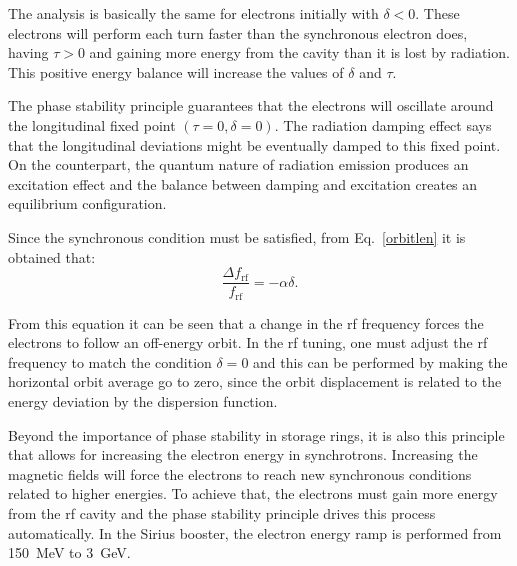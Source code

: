 The analysis is basically the same for electrons initially with $\delta < 0$. These electrons will perform each turn faster than the synchronous electron does, having $\tau > 0$ and gaining more energy from the cavity than it is lost by radiation. This positive energy balance will increase the values of $\delta$ and $\tau$.

The phase stability principle guarantees that the electrons will oscillate around the longitudinal fixed point $(\tau = 0, \delta = 0)$. The radiation damping effect says that the longitudinal deviations might be eventually damped to this fixed point. On the counterpart, the quantum nature of radiation emission produces an excitation effect and the balance between damping and excitation creates an equilibrium configuration.

Since the synchronous condition must be satisfied, from Eq.~\eqref{orbitlen} it is obtained that:
\begin{equation}
    \dfrac{\Delta f_{\mathrm{rf}}}{f_{\mathrm{rf}}} = -\alpha \delta.
    \label{eq:delta_freq}
\end{equation}

From this equation it can be seen that a change in the \gls{rf} frequency forces the electrons to follow an off-energy orbit. In the \gls{rf} tuning, one must adjust the \gls{rf} frequency to match the condition $\delta = 0$ and this can be performed by making the horizontal orbit average go to zero, since the orbit displacement is related to the energy deviation by the dispersion function.

Beyond the importance of phase stability in storage rings, it is also this principle that allows for increasing the electron energy in synchrotrons. Increasing the magnetic fields will force the electrons to reach new synchronous conditions related to higher energies. To achieve that, the electrons must gain more energy from the \gls{rf} cavity and the phase stability principle drives this process automatically. In the Sirius booster, the electron energy ramp is performed from \SI{150}{\mega \electronvolt} to \SI{3}{\giga \electronvolt}.

